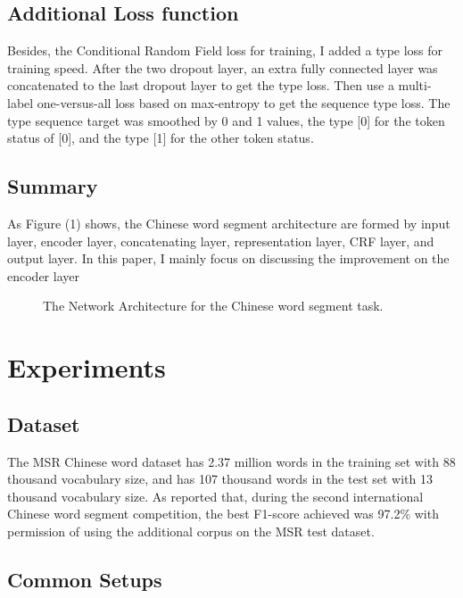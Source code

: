 \documentclass[11pt,a4paper]{article}
\begin{document}
\subsection{Additional Loss function}

Besides, the Conditional Random Field loss for training, I added a type loss for training speed.
After the two dropout layer, an extra fully connected layer was concatenated to the last dropout layer to get the type loss.
Then use a multi-label one-versus-all loss based on max-entropy to get the sequence type loss.
The type sequence target was smoothed by 0 and 1 values, the type [0] for the token status of [0], and the type [1] for the other token status.

\subsection{Summary}

As Figure (1) shows, the Chinese word segment architecture are formed by input layer, encoder layer, concatenating layer, representation layer, CRF layer, and output layer.
In this paper, I mainly focus on discussing the improvement on the encoder layer
\begin{figure*}
\begin{center}
\end{center}
   \caption{The Network Architecture for the Chinese word segment task.}
\label{fig:short}
\end{figure*}

\section{Experiments}

\subsection{Dataset}

 The MSR Chinese word dataset has 2.37 million words in the training set with 88 thousand vocabulary size,
 and has 107 thousand words in the test set with 13 thousand vocabulary size.
 As \citet{emerson2005second} reported that, during the second international Chinese word segment competition,
the best F1-score achieved was 97.2\% with permission of using the additional corpus on the MSR test dataset.

\subsection{Common Setups}
\end{document}
